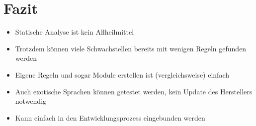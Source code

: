 \section{Fazit}
    \begin{frame}{\secname}
        \begin{itemize}
            \item Statische Analyse ist kein Allheilmittel
            \item Trotzdem können viele Schwachstellen bereits mit wenigen Regeln gefunden werden
            \item Eigene Regeln und sogar Module erstellen ist (vergleichsweise) einfach
            \item[\textrightarrow] Auch exotische Sprachen können getestet werden, kein Update des Herstellers notwendig
            \item Kann einfach in den Entwicklungsprozess eingebunden werden
        \end{itemize}
    \end{frame}
